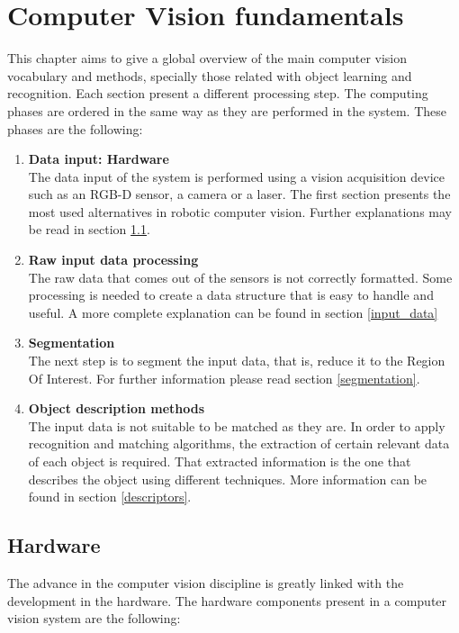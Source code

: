 \chapter{Computer Vision fundamentals}
This chapter aims to give a global overview of the main computer vision vocabulary and methods, specially those related with object learning and recognition. 
Each section present a different processing step. 
The computing phases are ordered in the same way as they are performed in the system. 
These phases are the following: 
\begin {enumerate}
	\item{\textbf{Data input: Hardware} \\}
	The data input of the system is performed using a vision acquisition device such as an RGB-D sensor, a camera or a laser. 
	The first section presents the most used alternatives in robotic computer vision. 
	Further explanations may be read in section \ref{hardware}.

	\item{\textbf{Raw input data processing}\\}
	The raw data that comes out of the sensors is not correctly formatted. 
	Some processing is needed to create a data structure that is easy to handle and useful. 
	A more complete explanation can be found in section \ref{input_data}

	\item{\textbf{Segmentation}\\}
	The next step is to segment the input data, that is, reduce it to the Region Of Interest. 
	For further information please read section \ref{segmentation}.

	\item{\textbf{Object description methods}\\}
	The input data is not suitable to be matched as they are. 
	In order to apply recognition and matching algorithms, the extraction of certain relevant data of each object is required. 
	That extracted information is the one that describes the object using different techniques. 
	More information can be found in section \ref{descriptors}.
\end{enumerate}


\section{Hardware}
\label{hardware}
The advance in the computer vision discipline is greatly linked with the development in the hardware. 
The hardware components present in a computer vision system are the following: 

